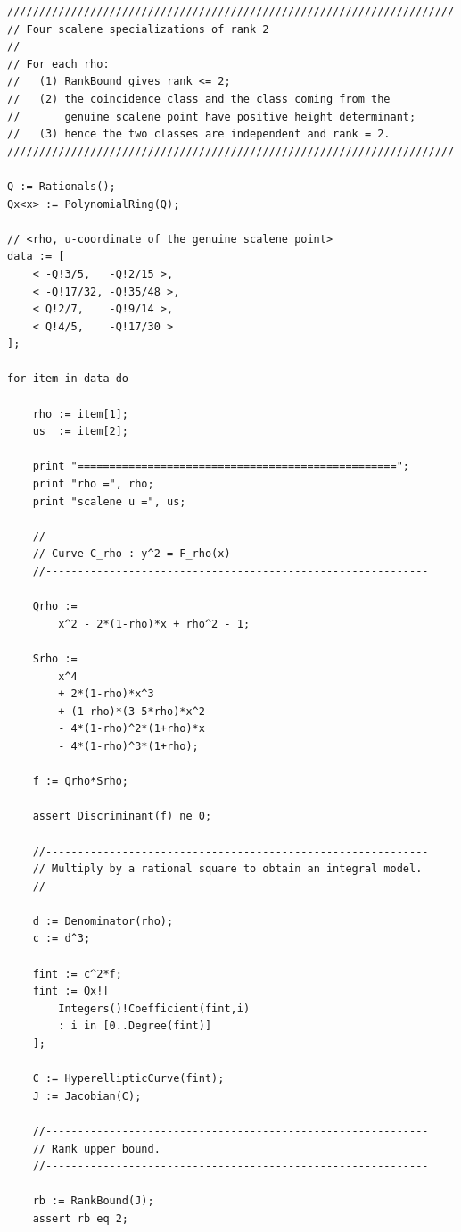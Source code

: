 \documentclass[11pt]{amsart}
\theoremstyle{plain}
\theoremstyle{remark}
\theoremstyle{plain}
\begin{document}
\begin{verbatim}
//////////////////////////////////////////////////////////////////////
// Four scalene specializations of rank 2
//
// For each rho:
//   (1) RankBound gives rank <= 2;
//   (2) the coincidence class and the class coming from the
//       genuine scalene point have positive height determinant;
//   (3) hence the two classes are independent and rank = 2.
//////////////////////////////////////////////////////////////////////

Q := Rationals();
Qx<x> := PolynomialRing(Q);

// <rho, u-coordinate of the genuine scalene point>
data := [
    < -Q!3/5,   -Q!2/15 >,
    < -Q!17/32, -Q!35/48 >,
    < Q!2/7,    -Q!9/14 >,
    < Q!4/5,    -Q!17/30 >
];

for item in data do

    rho := item[1];
    us  := item[2];

    print "==================================================";
    print "rho =", rho;
    print "scalene u =", us;

    //------------------------------------------------------------
    // Curve C_rho : y^2 = F_rho(x)
    //------------------------------------------------------------

    Qrho :=
        x^2 - 2*(1-rho)*x + rho^2 - 1;

    Srho :=
        x^4
        + 2*(1-rho)*x^3
        + (1-rho)*(3-5*rho)*x^2
        - 4*(1-rho)^2*(1+rho)*x
        - 4*(1-rho)^3*(1+rho);

    f := Qrho*Srho;

    assert Discriminant(f) ne 0;

    //------------------------------------------------------------
    // Multiply by a rational square to obtain an integral model.
    //------------------------------------------------------------

    d := Denominator(rho);
    c := d^3;

    fint := c^2*f;
    fint := Qx![
        Integers()!Coefficient(fint,i)
        : i in [0..Degree(fint)]
    ];

    C := HyperellipticCurve(fint);
    J := Jacobian(C);

    //------------------------------------------------------------
    // Rank upper bound.
    //------------------------------------------------------------

    rb := RankBound(J);
    assert rb eq 2;


\end{verbatim}
\end{document}
